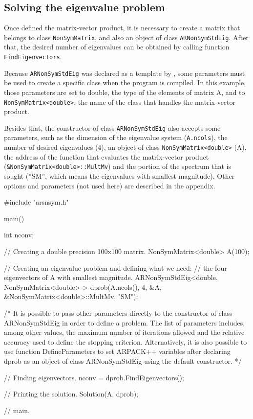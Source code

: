 \subsection{Solving the eigenvalue problem}

Once defined the matrix-vector product, it is necessary to create a matrix that belongs to class \texttt{NonSymMatrix}, and also an object of class \texttt{ARNonSymStdEig}. After that, the desired number of eigenvalues can be obtained by calling function \texttt{FindEigenvectors}.

Because \texttt{ARNonSymStdEig} was declared as a template by \ARPP{}, some parameters must be used to create a specific class when the program is compiled. In this example, those parameters are set to double, the type of the elements of matrix A, and to \texttt{NonSymMatrix<double>}, the name of the class that handles the matrix-vector product.

Besides that, the constructor of class \texttt{ARNonSymStdEig} also accepts some parameters, such as the dimension of the eigenvalue system (\texttt{A.ncols}), the number of desired eigenvalues (4), an object of class \texttt{NonSymMatrix<double>} (A), the address of the function that evaluates the matrix-vector product (\texttt{\&NonSymMatrix<double>::MultMv}) and the portion of the spectrum that is sought (”SM”, which means the eigenvalues with smallest magnitude). Other options and parameters (not used here) are described in the appendix.

\begin{cppcode}
#include "arsnsym.h"

main()
{
	int nconv;
	
	// Creating a double precision 100x100 matrix.
	NonSymMatrix<double> A(100);
	
	// Creating an eigenvalue problem and defining what we need: 
	// the four eigenvectors of A with smallest magnitude.
	ARNonSymStdEig<double, NonSymMatrix<double> >
	dprob(A.ncols(), 4, &A, &NonSymMatrix<double>::MultMv, "SM");
	
	/*
	It is possible to pass other parameters directly to the
	constructor of class ARNonSymStdEig in order to define a
	problem. The list of parameters includes, among other values,
	the maximum number of iterations allowed and the relative 
	accuracy used to define the stopping criterion. Alternatively, 
	it is also possible to use function DefineParameters to set 
	ARPACK++ variables after declaring dprob as an object of 
	class ARNonSymStdEig using the default constructor.
	*/
	
	// Finding eigenvectors.
	nconv = dprob.FindEigenvectors();
	
	// Printing the solution.
	Solution(A, dprob);
	
} // main.
\end{cppcode}

